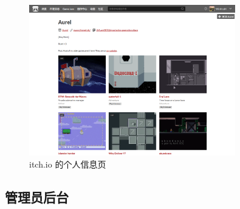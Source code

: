 \documentclass[12pt]{ctexart} %
\begin{document}
\begin{figure}[H]
  \centering
  \includegraphics[width=0.8\textwidth]{UI-profile.png}
  \caption{itch.io 的个人信息页}
\end{figure}


\subsection{管理员后台}
\end{document}
